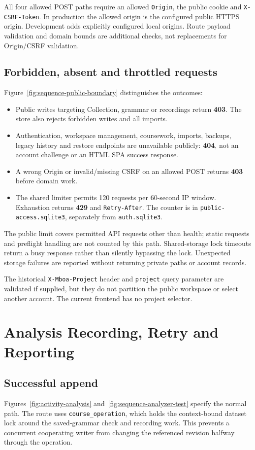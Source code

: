 \documentclass[11pt,a4paper]{article}
\begin{document}
All four allowed POST paths require an allowed \texttt{Origin}, the public
cookie and \texttt{X-CSRF-Token}. In production the allowed origin is the
configured public HTTPS origin. Development adds explicitly configured local
origins. Route payload validation and domain bounds are additional checks, not
replacements for Origin/CSRF validation.

\subsection{Forbidden, absent and throttled requests}
Figure~\ref{fig:sequence-public-boundary} distinguishes the outcomes:
\begin{itemize}
\item Public writes targeting Collection, grammar or recordings return
\textbf{403}. The store also rejects forbidden writes and all imports.
\item Authentication, workspace management, coursework, imports, backups,
legacy history and restore endpoints are unavailable publicly:
\textbf{404}, not an account challenge or an HTML SPA success response.
\item A wrong Origin or invalid/missing CSRF on an allowed POST returns
\textbf{403} before domain work.
\item The shared limiter permits 120 requests per 60-second IP window.
Exhaustion returns \textbf{429} and \texttt{Retry-After}. The counter is in
\nolinkurl{public-access.sqlite3}, separately from \nolinkurl{auth.sqlite3}.
\end{itemize}

The public limit covers permitted API requests other than health; static
requests and preflight handling are not counted by this path. Shared-storage
lock timeouts return a busy response rather than silently bypassing the lock.
Unexpected storage failures are reported without returning private paths or
account records.

The historical \texttt{X-Mboa-Project} header and \texttt{project} query parameter
are validated if supplied, but they do not partition the public workspace or
select another account. The current frontend has no project selector.

\section{Analysis Recording, Retry and Reporting}
\subsection{Successful append}
Figures~\ref{fig:activity-analysis} and~\ref{fig:sequence-analyzer-test} specify the
normal path. The route uses \texttt{course\_operation}, which holds the
context-bound dataset lock around the saved-grammar check and recording work.
This prevents a concurrent cooperating writer from changing the referenced
revision halfway through the operation.
\end{document}
